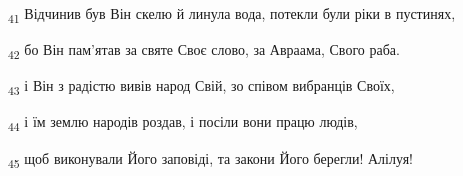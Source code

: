 \begin{tcolorbox}
\textsubscript{41} Відчинив був Він скелю й линула вода, потекли були ріки в пустинях,
\end{tcolorbox}
\begin{tcolorbox}
\textsubscript{42} бо Він пам'ятав за святе Своє слово, за Авраама, Свого раба.
\end{tcolorbox}
\begin{tcolorbox}
\textsubscript{43} і Він з радістю вивів народ Свій, зо співом вибранців Своїх,
\end{tcolorbox}
\begin{tcolorbox}
\textsubscript{44} і їм землю народів роздав, і посіли вони працю людів,
\end{tcolorbox}
\begin{tcolorbox}
\textsubscript{45} щоб виконували Його заповіді, та закони Його берегли! Алілуя!
\end{tcolorbox}
